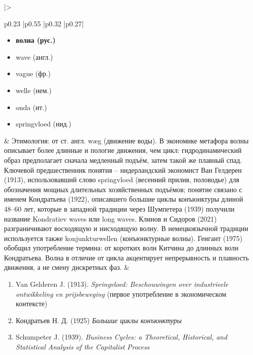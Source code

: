 \begin{longtable}{
    |>{\raggedright\arraybackslash}p{0.23\textwidth}
    |p{0.55\textwidth}
    |p{0.32\textwidth}
    |p{0.27\textwidth}|
    }
\begin{minipage}[t]{\linewidth}
    \raggedright
    \begin{itemize}
        \item \textbf{волна (рус.)}
        \item wave (англ.)
        \item vague (фр.)
        \item welle (нем.)
        \item onda (ит.)
        \item springvloed (нид.)
    \end{itemize}
\end{minipage}
&
Этимология: от ст. англ. \textquotedbl{}wæg\textquotedbl{} (движение воды). В экономике метафора волны описывает более длинные и пологие движения, чем \textquotedbl{}цикл\textquotedbl{}: гидродинамический образ предполагает сначала медленный подъём, затем такой же плавный спад. Ключевой предшественник понятия – нидерландский экономист Ван Гелдерен (1913), использовавший слово \textquotedbl{}springvloed\textquotedbl{} (весенний прилив, половодье) для обозначения мощных длительных хозяйственных подъёмов; понятие связано с именем Кондратьева (1922), описавшего \textquotedbl{}большие циклы конъюнктуры\textquotedbl{} длиной 48–60 лет, которые в западной традиции через Шумпетера (1939) получили название \textquotedbl{}Kondratiev waves\textquotedbl{} или \textquotedbl{}long waves\textquotedbl{}. Клинов и Сидоров (2021) разграничивают \textquotedbl{}восходящую и нисходящую волну\textquotedbl{}. В немецкоязычной традиции используется также \textquotedbl{}konjunkturwellen\textquotedbl{} (конъюнктурные волны). Геигант (1975) обобщил употребление термина: от коротких волн Китчина до длинных волн Кондратьева. \textquotedbl{}Волна\textquotedbl{} в отличие от \textquotedbl{}цикла\textquotedbl{} акцентирует непрерывность и плавность движения, а не смену дискретных фаз.
&
\begin{minipage}[t]{\linewidth}
    \vspace{-7pt}
    \RaggedRight
    \begin{enumerate}
        \item Van Gelderen J. (1913). \textit{Springvloed: Beschouwingen over industrieele ontwikkeling en prijsbeweging}\cite{Van-Gelderen-1913} (первое употребление в экономическом контексте)
        \item Кондратьев Н. Д. (1925) \textit{Большие циклы конъюнктуры}\cite{Кондратьев-1925}
        \item Schumpeter J. (1939). \textit{Business Cycles: a Theoretical, Historical, and Statistical Analysis of the Capitalist Process}\cite{Schumpeter-1939}

\end{enumerate}
\end{minipage}
\end{longtable}

